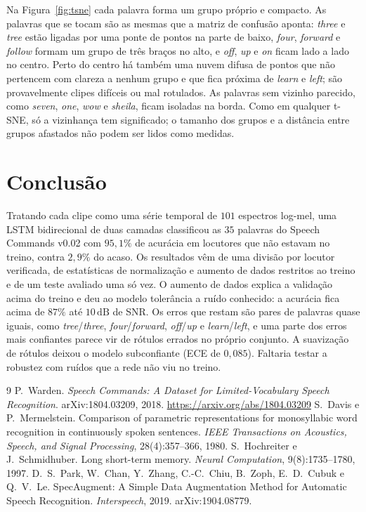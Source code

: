 \documentclass[11pt,a4paper]{article}
\newcommand{\w}[1]{\textit{#1}}
\begin{document}
Na Figura~\ref{fig:tsne} cada palavra forma um grupo próprio e compacto. As palavras que se tocam são as mesmas que a matriz de confusão aponta: \w{three} e \w{tree} estão ligadas por uma ponte de pontos na parte de baixo, \w{four}, \w{forward} e \w{follow} formam um grupo de três braços no alto, e \w{off}, \w{up} e \w{on} ficam lado a lado no centro. Perto do centro há também uma nuvem difusa de pontos que não pertencem com clareza a nenhum grupo e que fica próxima de \w{learn} e \w{left}; são provavelmente clipes difíceis ou mal rotulados. As palavras sem vizinho parecido, como \w{seven}, \w{one}, \w{wow} e \w{sheila}, ficam isoladas na borda. Como em qualquer t-SNE, só a vizinhança tem significado; o tamanho dos grupos e a distância entre grupos afastados não podem ser lidos como medidas.

\section{Conclusão}

Tratando cada clipe como uma série temporal de $101$ espectros log-mel, uma LSTM bidirecional de duas camadas classificou as $35$ palavras do Speech Commands v0.02 com $95{,}1\%$ de acurácia em locutores que não estavam no treino, contra $2{,}9\%$ do acaso. Os resultados vêm de uma divisão por locutor verificada, de estatísticas de normalização e aumento de dados restritos ao treino e de um teste avaliado uma só vez. O aumento de dados explica a validação acima do treino e deu ao modelo tolerância a ruído conhecido: a acurácia fica acima de $87\%$ até $10\,\mathrm{dB}$ de SNR. Os erros que restam são pares de palavras quase iguais, como \w{tree}/\w{three}, \w{four}/\w{forward}, \w{off}/\w{up} e \w{learn}/\w{left}, e uma parte dos erros mais confiantes parece vir de rótulos errados no próprio conjunto. A suavização de rótulos deixou o modelo subconfiante (ECE de $0{,}085$). Faltaria testar a robustez com ruídos que a rede não viu no treino.

\begin{thebibliography}{9}
 P.~Warden. \textit{Speech Commands: A Dataset for Limited-Vocabulary Speech Recognition}. arXiv:1804.03209, 2018. \url{https://arxiv.org/abs/1804.03209}
 S.~Davis e P.~Mermelstein. Comparison of parametric representations for monosyllabic word recognition in continuously spoken sentences. \textit{IEEE Transactions on Acoustics, Speech, and Signal Processing}, 28(4):357--366, 1980.
 S.~Hochreiter e J.~Schmidhuber. Long short-term memory. \textit{Neural Computation}, 9(8):1735--1780, 1997.
 D.~S.~Park, W.~Chan, Y.~Zhang, C.-C.~Chiu, B.~Zoph, E.~D.~Cubuk e Q.~V.~Le. SpecAugment: A Simple Data Augmentation Method for Automatic Speech Recognition. \textit{Interspeech}, 2019. arXiv:1904.08779.
\end{thebibliography}
\end{document}
